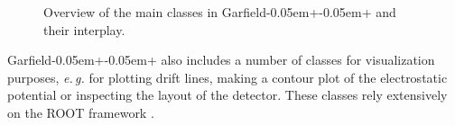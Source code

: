 \begin{figure}
{
  }
  \caption{Overview of the main classes in 
           Garfield\kern-0.05em+\kern-0.05em+ and their interplay.}
  \label{Fig:OverviewClasses}
\end{figure}

Garfield\kern-0.05em+\kern-0.05em+ also includes a number of classes for visualization purposes, 
\textit{e.\,g.} for plotting drift lines, making a contour plot of the electrostatic 
potential or inspecting the layout of the detector.   
These classes rely extensively on the ROOT framework \cite{ROOT}.

